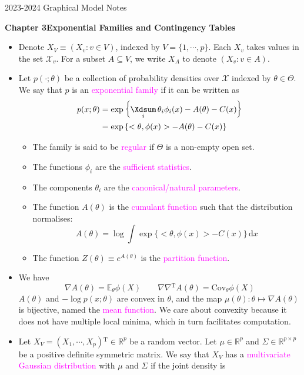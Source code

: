 \documentclass[UTF8]{book}
\date{}
\DeclareMathOperator*{\Xsum}{\mathchoice{\Xdsum}{\Xtsum}{\Xtsum}{\Xtsum}}
\newcommand{\et}{&}
\newcommand{\dx}{\,\mathrm{d}x}
\newcommand{\concept}[1]{\textcolor{magenta}{#1}}
\renewcommand{\t}{\ensuremath{^\mathrm{T}}}
\newcommand{\Cov}{\ensuremath{\mathrm{Cov}}}
\begin{document}
\begin{center}
\Large{2023-2024 Graphical Model Notes}
\end{center}
\large{\textbf{Chapter 3\quad Exponential Families and Contingency Tables}}
\begin{itemize}
\item Denote $X_V \equiv (X_v: v\in V)$, indexed by $V=\{1,\cdots,p\}$. Each $X_v$ takes values in the set $\mathcal{X}_v$. For a subset $A\subseteq V$, we write $X_A$ to denote $(X_v: v\in A)$.
\item Let $p(\cdot ;\theta)$ be a collection of probability densities over $\mathcal{X}$ indexed by $\theta \in \Theta$. We say that $p$ is an \concept{exponential family} if it can be written as 
\begin{align*}
	p(x;\theta) \et = \exp\left\{\Xsum_i\theta_i\phi_i(x) - A(\theta) - C(x)\right\}\\
	\et = \exp\left\{<\theta,\phi(x)> - A(\theta) - C(x)\right\}
\end{align*}
\begin{itemize}
	\item The family is said to be \concept{regular} if $\Theta$ is a non-empty open set.
	\item The functions $\phi_i$ are the \concept{sufficient statistics}.
	\item The components $\theta_i$ are the \concept{canonical/natural parameters}.
	\item The function $A(\theta)$ is the \concept{cumulant function} such that the distribution normalises:
	$$
		A(\theta) = \log\int\exp\{<\theta , \phi(x)> - C(x)\}\dx	
	$$
	\item The function $Z(\theta) \equiv e^{A(\theta)}$ is the \concept{partition function}.
\end{itemize}
\item We have
$$
\nabla A(\theta) = \mathbb{E}_{\theta}\phi(X) \qquad \nabla\nabla\t A(\theta) = \Cov_{\theta}\phi(X)
$$
$A(\theta)$ and $-\log p(x;\theta)$ are convex in $\theta$, and the map $\mu(\theta):\theta \mapsto \nabla A(\theta)$ is bijective, named the \concept{mean function}. We care about convexity because it does not have multiple local minima, which in turn facilitates computation.
\item Let $X_V = (X_1,\cdots,X_p)\t\in\mathbb{R}^p$ be a random vector. Let $\mu\in\mathbb{R}^p$ and $\Sigma\in\mathbb{R}^{p\times p}$ be a positive definite symmetric matrix. We say that $X_V$ has a \concept{multivariate Gaussian distribution} with $\mu$ and $\Sigma$ if the joint density is 

\end{itemize}
\end{document}

